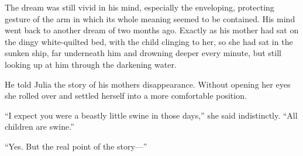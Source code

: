 The dream was still vivid in his mind, especially the enveloping,
protecting gesture of the arm in which its whole meaning seemed to be
contained. His mind went back to another dream of two months ago.
Exactly as his mother had sat on the dingy white-quilted bed, with the
child clinging to her, so she had sat in the sunken ship, far underneath
him and drowning deeper every minute, but still looking up at him
through the darkening water.

He told Julia the story of his mother\textquotesingle s disappearance.
Without opening her eyes she rolled over and settled herself into a more
comfortable position.

``I expect you were a beastly little swine in those days,'' she said
indistinctly. ``All children are swine.''

``Yes. But the real point of the story---''

